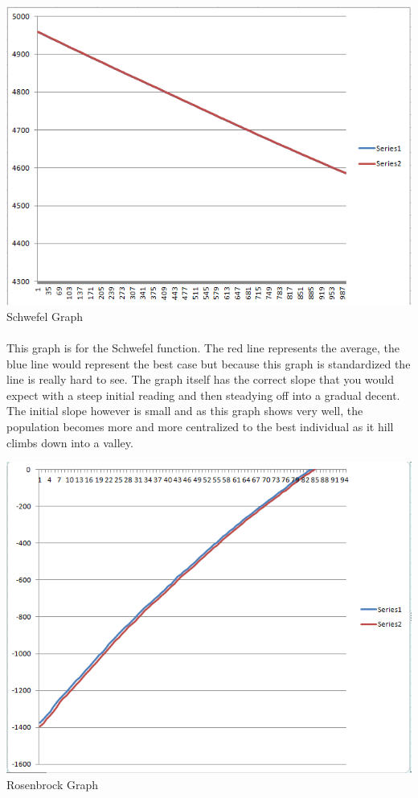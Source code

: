 \documentclass[paper=a4, fontsize=11pt]{scrartcl} %
\numberwithin{equation}{section} %
\numberwithin{figure}{section} %
\numberwithin{table}{section} %
\begin{document}
\includegraphics{Schwefel}
Schwefel Graph 

\paragraph{} This graph is for the Schwefel function. The red line represents the average, the blue line would represent the best case but because this graph is standardized the line is really hard to see. The graph itself has the correct slope that you would expect with a steep initial reading and then steadying off into a gradual decent. The initial slope however is small and as this graph shows very well, the population becomes more and more centralized to the best individual as it hill climbs down into a valley.

\includegraphics{Rosenbrock}
Rosenbrock Graph
\end{document}
